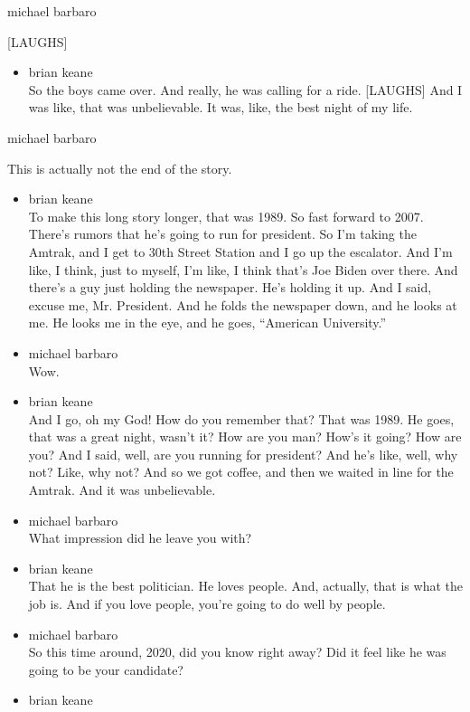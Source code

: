 michael barbaro

{[}LAUGHS{]}

\begin{itemize}
\tightlist
\item
  brian keane\\
  So the boys came over. And really, he was calling for a ride.
  {[}LAUGHS{]} And I was like, that was unbelievable. It was, like, the
  best night of my life.
\end{itemize}

michael barbaro

This is actually not the end of the story.

\begin{itemize}
\item
  brian keane\\
  To make this long story longer, that was 1989. So fast forward to
  2007. There's rumors that he's going to run for president. So I'm
  taking the Amtrak, and I get to 30th Street Station and I go up the
  escalator. And I'm like, I think, just to myself, I'm like, I think
  that's Joe Biden over there. And there's a guy just holding the
  newspaper. He's holding it up. And I said, excuse me, Mr. President.
  And he folds the newspaper down, and he looks at me. He looks me in
  the eye, and he goes, ``American University.''
\item
  michael barbaro\\
  Wow.
\item
  brian keane\\
  And I go, oh my God! How do you remember that? That was 1989. He goes,
  that was a great night, wasn't it? How are you man? How's it going?
  How are you? And I said, well, are you running for president? And he's
  like, well, why not? Like, why not? And so we got coffee, and then we
  waited in line for the Amtrak. And it was unbelievable.
\item
  michael barbaro\\
  What impression did he leave you with?
\item
  brian keane\\
  That he is the best politician. He loves people. And, actually, that
  is what the job is. And if you love people, you're going to do well by
  people.
\item
  michael barbaro\\
  So this time around, 2020, did you know right away? Did it feel like
  he was going to be your candidate?
\item
  brian keane\\

\end{itemize}

